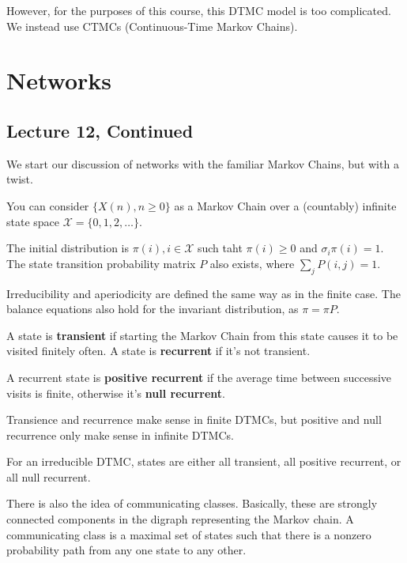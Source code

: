 However, for the purposes of this course, this DTMC model is too complicated. We instead use CTMCs (Continuous-Time
Markov Chains).

\section{Networks}

\subsection{Lecture 12, Continued}

We start our discussion of networks with the familiar Markov Chains, but with a twist.

\begin{definition}
    You can consider $\{X(n), n \geq 0\}$ as a Markov Chain over a (countably) infinite state space $\mathcal{X} = \{0, 1, 2, \dots\}$.
    
    The initial distribution is $\pi(i), i \in \mathcal{X}$ such taht $\pi(i) \geq 0$ and $\sigma_i \pi(i) = 1$.
    The state transition probability matrix $P$ also exists, where $\sum_j P(i, j) = 1$.
\end{definition}

Irreducibility and aperiodicity are defined the same way as in the finite case. The balance equations also hold for
the invariant distribution, as $\pi = \pi P$.

\begin{definition}
    A state is \textbf{transient} if starting the Markov Chain from this state causes it to be visited finitely often. A state is 
    \textbf{recurrent} if it's not transient.

    A recurrent state is \textbf{positive recurrent} if the average time between successive visits is finite, otherwise
    it's \textbf{null recurrent}.
\end{definition}

Transience and recurrence make sense in finite DTMCs, but positive and null recurrence only make sense in infinite DTMCs.

\begin{theorem}
    For an irreducible DTMC, states are either all transient, all positive recurrent, or all null recurrent.
\end{theorem}

There is also the idea of communicating classes. Basically, these are
strongly connected components in the digraph representing the Markov chain. A communicating class is a maximal set of
states such that there is a nonzero probability path from any one state to any other.

